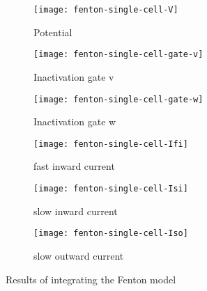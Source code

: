 \begin{figure}[h]
    \centering
    \begin{subfigure}[b]{.3\textwidth}
        \texttt{[image: fenton-single-cell-V]}
        \vspace{-\baselineskip}
        \caption{Potential}
        \label{fig:fenton1-V}
    \end{subfigure}
    \vspace{\baselineskip}
    \begin{subfigure}[b]{.3\textwidth}
        \texttt{[image: fenton-single-cell-gate-v]}
        \vspace{-\baselineskip}
        \caption{Inactivation gate v}
        \label{fig:fenton1-v}
    \end{subfigure}
    \begin{subfigure}[b]{.3\textwidth}
        \texttt{[image: fenton-single-cell-gate-w]}
        \vspace{-\baselineskip}
        \caption{Inactivation gate w}
        \label{fig:fenton1-w}
    \end{subfigure}
    \begin{subfigure}[b]{.3\textwidth}
        \texttt{[image: fenton-single-cell-Ifi]}
        \vspace{-\baselineskip}
        \caption{fast inward current}
        \label{fig:fenton1-Ifi}
    \end{subfigure}
    \begin{subfigure}[b]{.3\textwidth}
        \texttt{[image: fenton-single-cell-Isi]}
        \vspace{-\baselineskip}
        \caption{slow inward current}
        \label{fig:fenton1-Isi}
    \end{subfigure}
    \begin{subfigure}[b]{.3\textwidth}
        \texttt{[image: fenton-single-cell-Iso]}
        \vspace{-\baselineskip}
        \caption{slow outward current}
        \label{fig:fenton1-Iso}
    \end{subfigure}
    \caption{Results of integrating the Fenton model}
    \label{fig:fenton1}
\end{figure}

